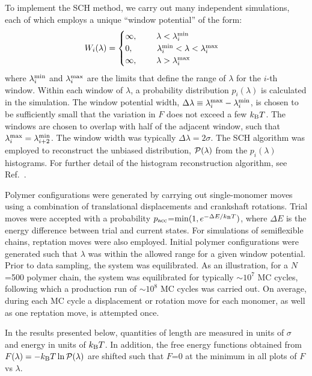 \documentclass[journal=mamobx,manuscript=article,layout=twocolumn]{achemso}
\begin{document}
To implement the SCH method, we carry out many independent simulations, each of which employs a
unique ``window potential'' of the form:
\begin{eqnarray}
{W_i(\lambda)}=\begin{cases} \infty, \hspace{8mm} \lambda<\lambda_i^{\rm min} \cr 0,
\hspace{1cm} \lambda_i^{\rm min}<\lambda<\lambda_i^{\rm max} \cr \infty,
\hspace{8mm} \lambda>\lambda_i^{\rm max} \cr
\end{cases}
\label{eq:winPot}
\end{eqnarray}
where $\lambda_i^{\rm min}$ and $\lambda_i^{\rm max}$ are the limits that define the range
of $\lambda$ for the $i$-th window.  Within each window of $\lambda$, a probability
distribution $p_i(\lambda)$ is calculated in the simulation. The window potential width,
$\Delta \lambda \equiv \lambda_i^{\rm max} - \lambda_i^{\rm min}$, is chosen to be
sufficiently small that the variation in $F$ does not exceed a few $k_{\rm B}T$.
The windows are chosen to overlap with half of the adjacent window, such that
$\lambda^{\rm max}_{i} = \lambda^{\rm min}_{i+2}$.  The window width was typically
$\Delta \lambda = 2\sigma$. The SCH algorithm was employed to reconstruct the unbiased
distribution, ${\cal P}(\lambda)$ from the $p_i(\lambda)$ histograms.  For further
detail of the histogram reconstruction algorithm, see Ref.~.

Polymer configurations were generated by carrying out single-monomer moves using a combination of
translational displacements and crankshaft rotations. Trial moves were accepted with a
probability $p_{\rm acc}$=${\rm min}(1,e^{-\Delta E/k_{\rm B}T})$, where $\Delta E$ is the energy
difference between trial and current states. For simulations of semiflexible chains,
reptation moves were also employed.  Initial polymer configurations were generated 
such that $\lambda$ was within the allowed range for a given window potential. 
Prior to data sampling, the system was equilibrated. As an illustration, for a $N$=500
polymer chain, the system was equilibrated
for typically $\sim 10^7$ MC cycles, following which a production run of $\sim 10^8$
MC cycles was carried out.  On average, during each MC cycle a displacement or rotation
move for each monomer, as well as one reptation move, is attempted once.

In the results presented below, quantities of length are measured in units of $\sigma$ and
energy in units of $k_{\rm B}T$. In addition, the free energy functions obtained from
$F(\lambda)=-k_{\rm B}T\ln {\cal P}(\lambda)$ are shifted such that $F$=0 at the minimum
in all plots of $F$ vs $\lambda$.
\end{document}
